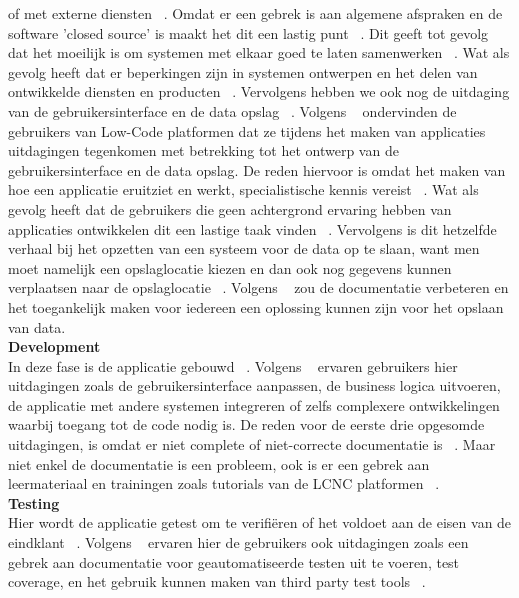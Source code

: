 of met externe diensten ~\autocite{Rokis_2022}. Omdat er een gebrek is aan algemene afspraken en de software 'closed source' is maakt het dit een lastig punt ~\autocite{Rokis_2022}.
 Dit geeft tot gevolg dat het moeilijk is om systemen met elkaar goed te laten samenwerken ~\autocite{Rokis_2022}. 
 Wat als gevolg heeft dat er beperkingen zijn in systemen ontwerpen en het delen van ontwikkelde diensten en producten ~\autocite{Rokis_2022}. 
 Vervolgens hebben we ook nog de uitdaging van de gebruikersinterface en de data opslag ~\autocite{Rokis_2022}. Volgens ~\textcite{Rokis_2022} 
 ondervinden de gebruikers van Low-Code platformen dat ze tijdens het maken van applicaties uitdagingen tegenkomen met betrekking tot het ontwerp 
 van de gebruikersinterface en de data opslag. De reden hiervoor is omdat het maken van hoe een applicatie eruitziet en werkt, specialistische kennis vereist ~\autocite{Rokis_2022}. 
 Wat als gevolg heeft dat de gebruikers die geen achtergrond ervaring hebben van applicaties ontwikkelen dit een lastige taak vinden ~\autocite{Rokis_2022}. 
 Vervolgens is dit hetzelfde verhaal bij het opzetten van een systeem voor de data op te slaan, want men moet namelijk een opslaglocatie kiezen en dan ook nog gegevens 
 kunnen verplaatsen naar de opslaglocatie ~\autocite{Rokis_2022}. Volgens ~\textcite{Rokis_2022} zou de documentatie verbeteren en het toegankelijk maken voor iedereen 
 een oplossing kunnen zijn voor het opslaan van data.
\\
\textbf{Development}
\\
In deze fase is de applicatie gebouwd ~\autocite{Rokis_2022}. 
Volgens ~\textcite{Rokis_2022} ervaren gebruikers hier uitdagingen zoals de gebruikersinterface aanpassen, de business logica uitvoeren, de applicatie met andere systemen integreren of zelfs complexere ontwikkelingen waarbij toegang tot de code nodig is. 
De reden voor de eerste drie opgesomde uitdagingen, is omdat er niet complete of niet-correcte documentatie is ~\autocite{Rokis_2022}. 
Maar niet enkel de documentatie is een probleem, ook is er een gebrek aan leermateriaal en trainingen zoals tutorials van de LCNC platformen ~\autocite{Rokis_2022}.
\\
\textbf{Testing}
\\
Hier wordt de applicatie getest om te verifiëren of het voldoet aan de eisen van de eindklant ~\autocite{Rokis_2022}. 
Volgens ~\textcite{Rokis_2022} ervaren hier de gebruikers ook uitdagingen zoals een gebrek aan documentatie voor geautomatiseerde testen uit te voeren, 
test coverage, en het gebruik kunnen maken van third party test tools ~\autocite{Rokis_2022}. 
